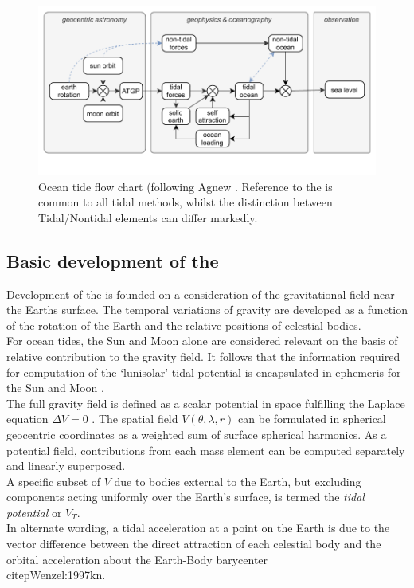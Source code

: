 \begin{figure}[h]
\begin{center}
\includegraphics[width=\figwidthFull]{figures/diagrams/tidal_force_flowchart.pdf}
\caption{Ocean tide flow chart (following Agnew \citep{Agnew:2011ub}.  Reference to the \ATGP{} is common to all tidal methods, whilst the distinction between Tidal/Nontidal elements can differ markedly.}
\label{fig:TIDE_FORCE_FLOW}
\end{center}
\end{figure}


\subsection{Basic development of the \ATGP{}}  \label{S:basic_potential}

Development of the \ATGP{} is founded on a consideration of the gravitational field near the Earths surface. The temporal variations of gravity are developed as a function of the rotation of the Earth and the relative positions of celestial bodies.\\
For ocean tides, the Sun and Moon alone are considered relevant on the basis of relative contribution to the gravity field. It follows that the information required for computation of the `lunisolar' tidal potential is encapsulated in ephemeris for the Sun and Moon \citep{Agnew:2011ub}.\\



The full gravity field is defined as a scalar potential in space fulfilling the Laplace equation $\Delta V=0$ \citep[sec 5.3.1]{Urban:2013vl}.  The spatial field $V(\theta,\lambda,r)$ can be formulated in spherical geocentric coordinates as a weighted sum of surface spherical harmonics. As a potential field, contributions from each mass element can be computed separately and linearly superposed.\\
A specific subset of $V$ due to bodies external to the Earth, but excluding components acting uniformly over the Earth's surface, is termed the \emph{tidal potential} \ATGP{} or $V_T$.\\
In alternate wording, a tidal acceleration at a point on the Earth is due to the vector difference between the direct attraction of each celestial body and the orbital acceleration about the Earth-Body barycenter\\citep{Wenzel:1997kn}.\\

